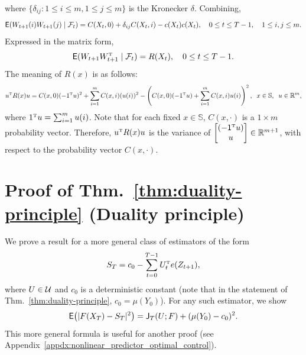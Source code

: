 \documentclass[twoside,11pt]{article}
\def\Re{\mathbb{R}}
\newcommand{\field}[1]{\mathbb{#1}}
\def\Re{\field{R}}
\def\E{{\sf E}}
\def\bS{\begin{slide}}
\def\Re{\mathbb{R}}
\def\E{{\sf E}}
\def\Thm#1{Thm.~\ref{#1}}
\renewcommand{\Re}{\mathbb{R}}
\def\clF{{\cal F}}
\def\clU{{\cal U}}
\def\E{{\sf E}}
\def\bS{\mathbb{S}}
\def\sJ{{\sf J}}
\def\ones{{\sf 1}}
\def\tp{{\hbox{\rm\tiny T}}}
\begin{document}
where $\{\delta_{ij}:1\leq i\leq m,1\leq j\leq m\}$ is the Kronecker
$\delta$.  Combining,
\begin{equation*}
\E(W_{t+1}(i) W_{t+1}(j) \mid \clF_t)= C(X_t,0) + \delta_{ij} C(X_t,i)
-c(X_t) c(X_t),\quad 0\leq t\leq T-1,\quad 1\leq i,j\leq m.
\end{equation*}
Expressed in the matrix form,
\begin{equation*}
\E (W_{t+1} W_{t+1}^\tp \mid \clF_t) = R(X_t),\quad 0\leq t\leq T-1.
\end{equation*}
The meaning of $R(x)$ is as
 follows: 
 \begin{equation*}
 u^\tp R(x) u = C(x,0) (-1^\tp u)^2 + \sum_{i=1}^m C(x,i) (u(i))^2 -
 \left( C(x,0) (-1^\tp u) + \sum_{i=1}^m C(x,i) u(i) \right)^2,\;\;
 x\in \bS, \;\;u\in\Re^m,
\end{equation*}
where $1^\tp u = \sum_{i=1}^m u(i)$.  Note that for each fixed
$x\in\bS$, $C(x,\cdot)$ is a $1\times m$ probability vector.  
Therefore, $u^\tp R(x) u$ is the variance of $\begin{bmatrix} 
  (-\ones^\tp u) \\ u\end{bmatrix}\in \Re^{m+1}$, with respect to
the probability vector $C(x,\cdot)$. 

\section{Proof of \Thm{thm:duality-principle} (Duality principle)}
\label{appdx:duality-principle}

We prove a result for a more general class of estimators of the form
\begin{equation*}
		S_T = c_0- \sum_{t=0}^{T-1} U_t^\tp e(Z_{t+1}),
\end{equation*}
 where $U\in\clU$ and $c_0$ is a deterministic constant (note that in
 the statement of \Thm{thm:duality-principle}, $c_0=\mu(Y_0)$).  
For any such estimator, we show 
\begin{align}\label{eq:duality_formula_more_general}
		\E\big(|F(X_T)-S_T|^2\big) = \sJ_T(U;F) + (\mu(Y_0) - c_0)^2.
\end{align}
This more general formula is useful for another proof (see
Appendix~\ref{appdx:nonlinear_predictor_optimal_control}). 
\end{document}
